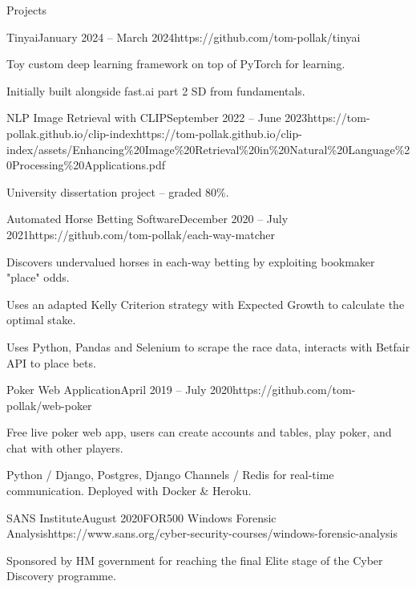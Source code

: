 \documentclass{structure}
\begin{document}
\begin{rSection}{Projects}

    \begin{rSubsection}{Tinyai}{January 2024 -- March 2024}{}{}{https://github.com/tom-pollak/tinyai}{}
        \item Toy custom deep learning framework on top of PyTorch for learning.
        \item Initially built alongside fast.ai part 2 SD from fundamentals.
    \end{rSubsection}

    \begin{rSubsection}{NLP Image Retrieval with CLIP}{September 2022 -- June 2023}{}{}{https://tom-pollak.github.io/clip-index}{https://tom-pollak.github.io/clip-index/assets/Enhancing\%20Image\%20Retrieval\%20in\%20Natural\%20Language\%20Processing\%20Applications.pdf}
        \item University dissertation project -- graded 80\%.
    \end{rSubsection}


    \begin{rSubsection}{Automated Horse Betting Software}{December 2020 -- July 2021}{}{}{https://github.com/tom-pollak/each-way-matcher}{}
        \item Discovers undervalued horses in each-way betting by exploiting bookmaker
        "place" odds.
        \item Uses an adapted Kelly Criterion strategy with Expected Growth to calculate
        the optimal stake.
        \item Uses Python, Pandas and Selenium to scrape the race data, interacts with
        Betfair API to place bets.
    \end{rSubsection}

    \begin{rSubsection}{Poker Web Application}{April 2019 -- July 2020}{}{}{https://github.com/tom-pollak/web-poker}{}
        \item Free live poker web app, users can create accounts and tables, play poker, and chat with other players.
        \item Python / Django, Postgres, Django Channels / Redis for real-time communication. Deployed with Docker \& Heroku.
    \end{rSubsection}

    \begin{rSubsection}{SANS Institute}{August 2020}{FOR500 Windows Forensic Analysis}{}{https://www.sans.org/cyber-security-courses/windows-forensic-analysis}{}
        \item Sponsored by HM government for reaching the final Elite stage of the Cyber Discovery programme.
    \end{rSubsection}

\end{rSection}
\end{document}
